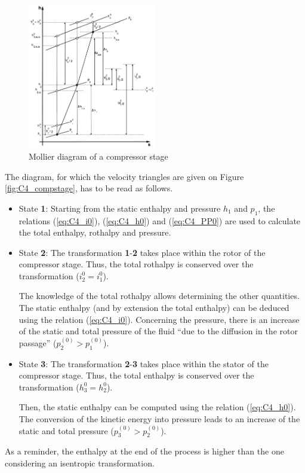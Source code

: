 \begin{figure}[h]
    \centering
    \includegraphics[width=0.5\textwidth]{Comp_mollier.png}
    \caption{Mollier diagram of a compressor stage \cite{Hillewaert2019}}
    \label{fig:C4_Molliercomp}
\end{figure}

The diagram, for which the velocity triangles are given on Figure \ref{fig:C4_compstage}, has to be read as follows.
\begin{itemize}
    \item State \textbf{1}: Starting from the static enthalpy and pressure \(h_1\) and \(p_1\), the relations (\ref{eq:C4_i0}), (\ref{eq:C4_h0}) and (\ref{eq:C4_PP0}) are used to calculate the total enthalpy, rothalpy and pressure.
    \item State \textbf{2}: The transformation \textbf{1}-\textbf{2} takes place within the rotor of the compressor stage. Thus, the total rothalpy is conserved over the transformation ($i_2^0=i_1^0$).

    The knowledge of the total rothalpy allows determining the other quantities. The static enthalpy (and by extension the total enthalpy) can be deduced using the relation (\ref{eq:C4_i0}). Concerning the pressure, there is an increase of the static and total pressure of the fluid “due to the diffusion in the rotor passage” \cite{Hillewaert2019} ($p_2^{(0)} > p_1^{(0)}$).

    \item State \textbf{3}: The transformation \textbf{2}-\textbf{3} takes place within the stator of the compressor stage. Thus, the total enthalpy is conserved over the transformation ($h_3^0 = h_2^0$).

    Then, the static enthalpy can be computed using the relation (\ref{eq:C4_h0}). The conversion of the kinetic energy into pressure leads to an increase of the static and total pressure ($p_3^{(0)} > p_2^{(0)}$).
\end{itemize}
As a reminder, the enthalpy at the end of the process is higher than the one considering an isentropic transformation.
